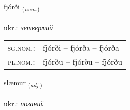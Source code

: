 \documentclass[frontgrid, backgrid]{flacards}\usepackage[]{graphicx}\usepackage[]{xcolor}
\begin{document}
\renewcommand{\flhead}{\vskip5pt \fboxsep=0pt {\small\bfseries\footnotesize Töluorð | чисельник}}
\renewcommand{\fcfoot}{\vskip5pt \fboxsep=0pt \hspace{2pt}{\small\bfseries\footnotesize 2K}}

\renewcommand{\blhead}{\vskip5pt {\small\bfseries\footnotesize Töluorð | чисельник }}
\renewcommand{\bcfoot}{\vskip5pt \hspace{2pt}{\small\bfseries\footnotesize 2K}}


{fjórði \small{\textsubscript{(\textit{num.})}} \\[1ex] %
\textphonetic{[fjourðɪ]} \\
ukr.: \emph{четвертий} \\  [2ex]
\renewcommand*{\arraystretch}{0.8}
\begin{tabular}{ll}
\textsc{sg.nom.}: & fjórði  --  fjórða -- fjórða \\ 
\textsc{pl.nom.}: & fjórðu -- fjórðu -- fjórðu
\end{tabular}
}

\renewcommand{\flhead}{\vskip5pt \fboxsep=0pt {\small\bfseries\footnotesize Lýsingarorð | прикметник}}
\renewcommand{\fcfoot}{\vskip5pt \fboxsep=0pt \hspace{2pt}{\small\bfseries\footnotesize 2K}}

\renewcommand{\blhead}{\vskip5pt {\small\bfseries\footnotesize Lýsingarorð | прикметник }}
\renewcommand{\bcfoot}{\vskip5pt \hspace{2pt}{\small\bfseries\footnotesize 2K}}


{slæmur \small{\textsubscript{(\textit{adj.})}} \\[1ex] %
\textphonetic{[stlaiːmʏr]} \\
ukr.: \emph{поганий} \\  [2ex]
\renewcommand*{\arraystretch}{0.8}
}
\end{document}
